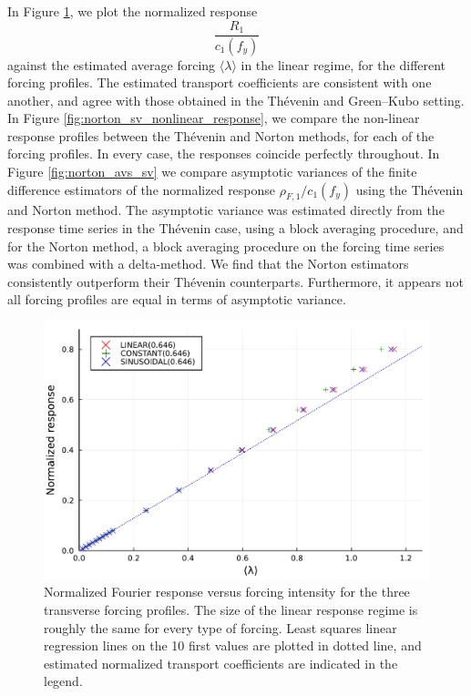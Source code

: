 In Figure \ref{fig:norton_sv_linear_response}, we plot the normalized response \[\frac{R_1}{c_1(f_y)}\] against the estimated average forcing $\langle \lambda \rangle$ in the linear regime, for the different forcing profiles.
The estimated transport coefficients are consistent with one another, and agree with those obtained in the Thévenin and Green--Kubo setting.
In Figure \ref{fig:norton_sv_nonlinear_response}, we compare the non-linear response profiles between the Thévenin and Norton methods, for each of the forcing profiles. In every case, the responses coincide perfectly throughout.
In Figure \ref{fig:norton_avs_sv} we compare asymptotic variances of the finite difference estimators of the normalized response $\rho_{F,1}/c_1(f_y)$ using the Thévenin and Norton method. The asymptotic variance was estimated directly from the response time series in the Thévenin case, using a block averaging procedure,
and for the Norton method, a block averaging procedure on the forcing time series was combined with a delta-method. We find that the Norton estimators consistently outperform their Thévenin counterparts. Furthermore, it appears not all forcing profiles are equal in terms of asymptotic variance.
\begin{figure}[htbp]
  \begin{center}
    \includegraphics[width=0.9\linewidth]{figures/norton_sv_lin.pdf}
    \caption{ \label{fig:norton_sv_linear_response}
      Normalized Fourier response versus forcing intensity for the three transverse forcing profiles.
      The size of the linear response regime is roughly the same for every type of forcing. Least squares linear regression lines on the 10 first values are plotted in dotted line, and estimated normalized transport coefficients are indicated in the legend.
    }
  \end{center}
\end{figure}
